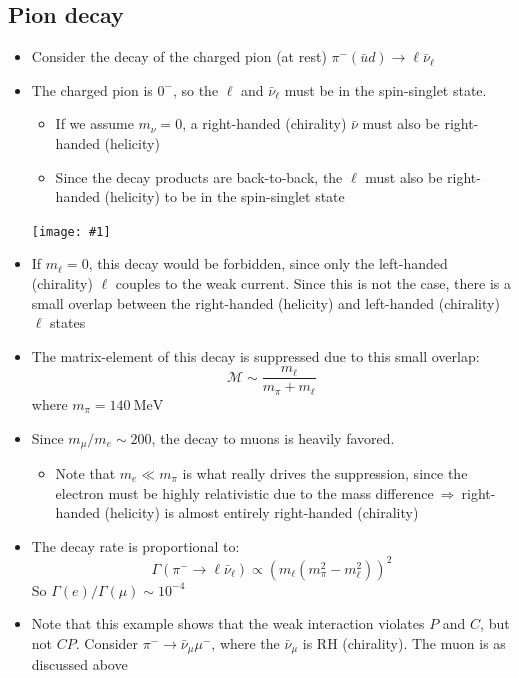 \documentclass[11pt]{article}
\newcommand{\ubar}{\bar{u}}
\newcommand{\nubar}{{\bar{\nu}}}
\newcommand{\Mme}{\mathcal{M}}
\newcommand{\mev}{\text{MeV}}
\newcommand{\thus}{\ensuremath{~\Rightarrow~}}
\newcommand{\embedimgw}[2]{\begin{center}\texttt{[image: \#1]}\end{center}}
\begin{document}
\subsection{Pion decay}
\begin{itemize}
  \item Consider the decay of the charged pion (at rest) $\pi^-(\ubar d)\rightarrow \ell \nubar_\ell$
  \item The charged pion is $0^-$, so the $\ell$ and $\nubar_\ell$ must be in the spin-singlet state. 
  \begin{itemize}
    \item If we assume $m_\nu = 0$, a right-handed (chirality) $\nubar$ must also be right-handed (helicity)
    \item Since the decay products are back-to-back, the $\ell$ must also be right-handed (helicity) to be in the spin-singlet state
  \end{itemize}
  \embedimgw{figs/piondecay.png}{.6}
  \item If $m_\ell = 0$, this decay would be forbidden, since only the left-handed (chirality) $\ell$ couples to the weak current. Since this is not the case, there is a small overlap between the right-handed (helicity) and left-handed (chirality) $\ell$ states
  \item The matrix-element of this decay is suppressed due to this small overlap:
  \begin{equation}
    \Mme \sim \frac{m_\ell}{m_\pi + m_\ell}
  \end{equation}
  where $m_\pi = 140~\mev$
  \item Since $m_\mu/m_e \sim 200$, the decay to muons is heavily favored.
  \begin{itemize}
    \item Note that $m_e \ll m_\pi$ is what really drives the suppression, since the electron must be highly relativistic due to the mass difference\thus right-handed (helicity) is almost entirely right-handed (chirality)
  \end{itemize}
  \item The decay rate is proportional to:
  \begin{equation}
    \Gamma (\pi^- \rightarrow \ell \nubar_\ell) \propto \left(m_\ell \left(m_\pi^2 - m_\ell^2\right) \right)^2
  \end{equation}
  So $\Gamma(e)/\Gamma(\mu) \sim 10^{-4}$
  \item Note that this example shows that the weak interaction violates $P$ and $C$, but not $CP$. Consider $\pi^-\rightarrow \nubar_\mu \mu^-$, where the $\nubar_\mu$ is RH (chirality). The muon is as discussed above

\end{itemize}
\end{document}
